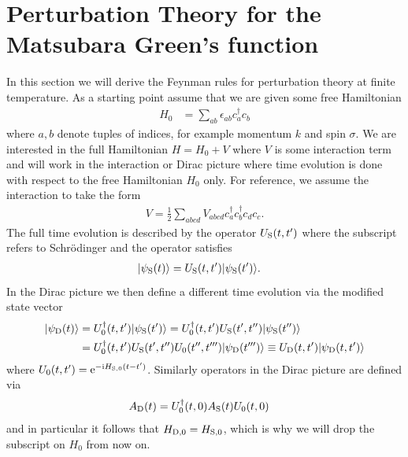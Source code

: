 \documentclass[english, parskip=full]{scrartcl}
\title{\titel}
\author{\autor}
\date{\today}
\begin{document}
\maketitle  %


\section{Perturbation Theory for the Matsubara Green's function}
In this section we will derive the Feynman rules for perturbation theory at finite temperature.
As a starting point assume that we are given some free Hamiltonian
\begin{align}
H_0 &= \sum_{ab} \epsilon_{ab} c_a^\dagger c_b
\end{align}
where $a,b$ denote tuples of indices, for example momentum $k$ and spin $\sigma$.
We are interested in the full Hamiltonian $H=H_0+V$ where $V$ is some interaction term and will work in the interaction or Dirac picture where time evolution is done with respect to the free Hamiltonian $H_0$ only.
For reference, we assume the interaction to take the form
\begin{align}
V = \frac{1}{2} \sum_{abcd} V_{abcd} c_a^\dagger c_b^\dagger c_d c_c.
\end{align}
The full time evolution is described by the operator $U_{\text{S}}(t,t')$ where the subscript refers to Schrödinger and the operator satisfies
\begin{align}
\vert \psi_{\text{S}}(t) \rangle &= U_{\text{S}}(t,t') \vert \psi_{\text{S}}(t') \rangle.
\end{align}
In the Dirac picture we then define a different time evolution via the modified state vector
\begin{align}
\vert \psi_{\text{D}}(t) \rangle &= U_{0}^\dagger(t,t') \vert \psi_{\text{S}}(t') \rangle = U_0^\dagger(t,t') U_{\text{S}}(t',t'') \vert \psi_{\text{S}}(t'') \rangle \\
&= U_0^\dagger(t,t') U_{\text{S}}(t',t'') U_0(t'',t''') \vert \psi_{\text{D}}(t''') \rangle \equiv U_{\text{D}}(t,t') \vert \psi_{\text{D}}(t,t') \rangle
\end{align}
where $U_0(t,t') = \text{e}^{-\text{i} H_{\text{S},0} (t-t')}$.
Similarly operators in the Dirac picture are defined via
\begin{align}
A_{\text{D}}(t) &= U_0^\dagger(t,0) A_{\text{S}}(t) U_0(t,0)
\end{align}
and in particular it follows that $H_{\text{D},0} = H_{\text{S},0}$, which is why we will drop the subscript on $H_0$ from now on.
\end{document}
